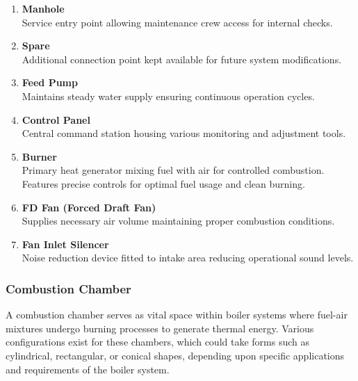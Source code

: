 \begin{enumerate}
    \item \textbf{Manhole}\\
    Service entry point allowing maintenance crew access for internal checks.

    \item \textbf{Spare}\\
    Additional connection point kept available for future system modifications.

    \item \textbf{Feed Pump}\\
    Maintains steady water supply ensuring continuous operation cycles.

    \item \textbf{Control Panel}\\
    Central command station housing various monitoring and adjustment tools.

    \item \textbf{Burner}\\
    Primary heat generator mixing fuel with air for controlled combustion. Features precise controls for optimal fuel usage and clean burning.

    \item \textbf{FD Fan (Forced Draft Fan)}\\
    Supplies necessary air volume maintaining proper combustion conditions.

    \item \textbf{Fan Inlet Silencer}\\
    Noise reduction device fitted to intake area reducing operational sound levels.
\end{enumerate}

\subsubsection{Combustion Chamber}
A combustion chamber serves as vital space within boiler systems where fuel-air mixtures undergo burning processes to generate thermal energy. Various configurations exist for these chambers, which could take forms such as cylindrical, rectangular, or conical shapes, depending upon specific applications and requirements of the boiler system.

